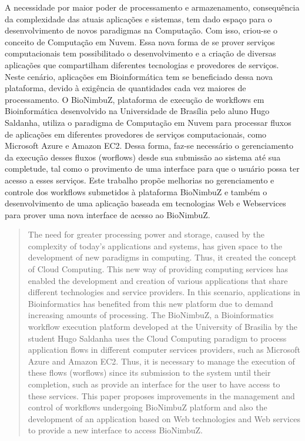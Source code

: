 \documentclass[bacharelado]{unb-cic}
\begin{document}
\begin{resumo}
A necessidade por maior poder de processamento e armazenamento, consequência da complexidade das atuais aplicações e sistemas, tem dado espaço para o desenvolvimento de novos paradigmas na Computação. Com isso, criou-se o conceito de Computação em Nuvem. Essa nova forma de se prover serviços computacionais tem possibilitado o desenvolvimento e a criação de diversas aplicações que compartilham diferentes tecnologias e provedores de serviços. Neste cenário, aplicações em Bioinformática tem se beneficiado dessa nova plataforma, devido à exigência de quantidades cada vez maiores de processamento. O BioNimbuZ, plataforma de execução de workflows em Bioinformática desenvolvido na Universidade de Brasília pelo aluno Hugo Saldanha, utiliza o paradigma de Computação em Nuvem para processar fluxos de aplicações em diferentes provedores de serviços computacionais, como Microsoft Azure e Amazon EC2. Dessa forma, faz-se necessário o gerenciamento da execução desses fluxos (worflows) desde sua submissão ao sistema até sua completude, tal como o provimento de uma interface para que o usuário possa ter acesso a esses serviços. Este trabalho propõe melhorias no gerenciamento e controle dos workflows submetidos à plataforma BioNimbuZ e também o desenvolvimento de uma aplicação baseada em tecnologias Web e Webservices para prover uma nova interface de acesso ao BioNimbuZ.
  \end{resumo}

  \begin{abstract}
The need for greater processing power and storage, caused by the complexity of today's applications and systems, has given space to the development of new paradigms in computing. Thus, it created the concept of Cloud Computing. This new way of providing computing services has enabled the development and creation of various applications that share different technologies and service providers. In this scenario, applications in Bioinformatics has benefited from this new platform due to demand increasing amounts of processing. The BioNimbuZ, a Bioinformatics workflow execution platform developed at the University of Brasilia by the student Hugo Saldanha uses the Cloud Computing paradigm to process application flows in different computer services providers, such as Microsoft Azure and Amazon EC2. Thus, it is necessary to manage the execution of these flows (worflows) since its submission to the system until their completion, such as provide an interface for the user to have access to these services. This paper proposes improvements in the management and control of workflows undergoing BioNimbuZ platform and also the development of an application based on Web technologies and Web services to provide a new interface to access BioNimbuZ.
  \end{abstract}
\end{document}
